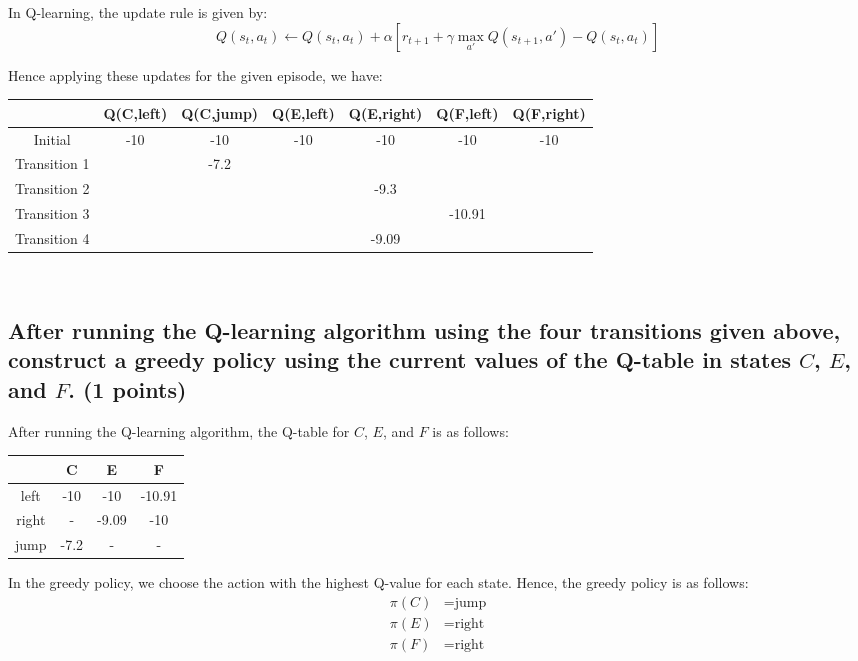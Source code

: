 \documentclass{article}
\begin{document}
In Q-learning, the update rule is given by:
\begin{equation*}
	Q(s_t, a_t) \leftarrow Q(s_t, a_t) + \alpha \left[ r_{t+1} + \gamma \max_{a'} Q(s_{t+1}, a') - Q(s_t, a_t) \right]
\end{equation*}

\pagebreak
\noindent
Hence applying these updates for the given episode, we have:\\

\begin{center}
\begin{tabular}{|c|c|c|c|c|c|c|}
\hline
& Q(C,left) & Q(C,jump) & Q(E,left) & Q(E,right) & Q(F,left) & Q(F,right) \\
\hline
Initial & -10& -10& -10& -10& -10& -10\\
\hline
Transition 1 & &-7.2 & & & & \\
\hline
Transition 2 & & & &-9.3 & & \\
\hline
Transition 3 & & & & &-10.91 & \\
\hline
Transition 4 & & & &-9.09 & & \\
\hline
\end{tabular}
\end{center}

\,\\

\subsection{After running the Q-learning algorithm using the four transitions given above, construct a greedy policy using the current values of the Q-table in states $C$, $E$, and $F$. (1 points)}

After running the Q-learning algorithm, the Q-table for $C$, $E$, and $F$ is as follows:
\begin{center}
	\begin{tabular}{|c|c|c|c|}
		\hline
		& C & E & F \\
		\hline
		left & -10 & -10 & -10.91 \\
		\hline
		right & - & -9.09 & -10 \\
		\hline
		jump & -7.2 & - & - \\
		\hline
	\end{tabular}
\end{center}

\noindent
In the greedy policy, we choose the action with the highest Q-value for each state. Hence, the greedy policy is as follows:
\begin{align*}
	\pi(C) &= \text{jump} \\
	\pi(E) &= \text{right} \\
	\pi(F) &= \text{right}
\end{align*}
\end{document}
